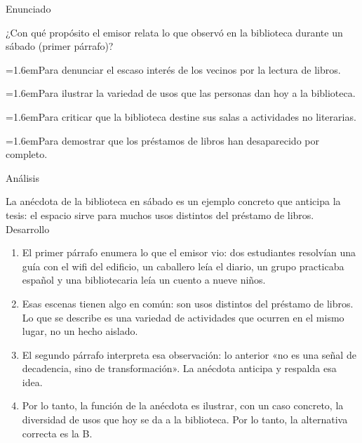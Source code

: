 \documentclass[10pt,a4paper,twocolumn]{article}
\newcommand{\alternativa}[2]{\par\noindent\hangindent=1.6em\hangafter=1\makebox[1.6em][l]{\tecla{#1}}#2\par}
\newcommand{\clave}[1]{\par\smallskip{\sffamily\footnotesize\color{esmeralda} Clave \teclaok{#1}}\par}
\begin{document}
\begin{ejemplo}
{\sffamily\footnotesize\color{zinc500} Enunciado}\par
¿Con qué propósito el emisor relata lo que observó en la biblioteca durante un sábado (primer párrafo)?
\alternativa{A}{Para denunciar el escaso interés de los vecinos por la lectura de libros.}
\alternativa{B}{Para ilustrar la variedad de usos que las personas dan hoy a la biblioteca.}
\alternativa{C}{Para criticar que la biblioteca destine sus salas a actividades no literarias.}
\alternativa{D}{Para demostrar que los préstamos de libros han desaparecido por completo.}
\clave{B}
{\sffamily\footnotesize\color{zinc500} Análisis}\par La anécdota de la biblioteca en sábado es un ejemplo concreto que anticipa la tesis: el espacio sirve para muchos usos distintos del préstamo de libros.
{\sffamily\footnotesize\color{zinc500} Desarrollo}
\begin{enumerate}
  \item El primer párrafo enumera lo que el emisor vio: dos estudiantes resolvían una guía con el wifi del edificio, un caballero leía el diario, un grupo practicaba español y una bibliotecaria leía un cuento a nueve niños.
  \item Esas escenas tienen algo en común: son usos distintos del préstamo de libros. Lo que se describe es una variedad de actividades que ocurren en el mismo lugar, no un hecho aislado.
  \item El segundo párrafo interpreta esa observación: lo anterior «no es una señal de decadencia, sino de transformación». La anécdota anticipa y respalda esa idea.
  \item Por lo tanto, la función de la anécdota es ilustrar, con un caso concreto, la diversidad de usos que hoy se da a la biblioteca. Por lo tanto, la alternativa correcta es la B.
\end{enumerate}
\end{ejemplo}
\end{document}
